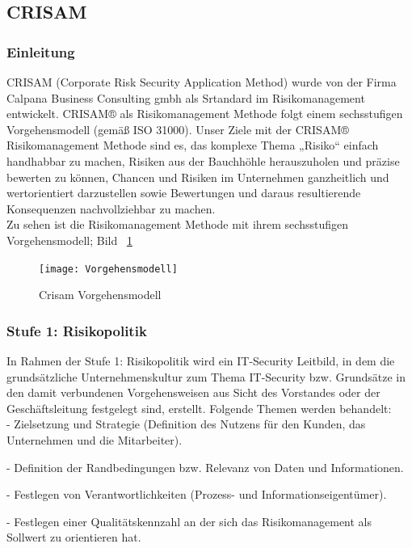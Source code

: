 \subsection{CRISAM}
\subsubsection{Einleitung}

CRISAM (Corporate Risk Security Application Method) wurde von der Firma Calpana Business Consulting gmbh als Srtandard im Risikomanagement entwickelt. CRISAM® als Risikomanagement Methode folgt einem sechsstufigen Vorgehensmodell (gemäß ISO 31000). Unser Ziele mit der CRISAM® Risikomanagement Methode sind  es,  das komplexe Thema „Risiko“ einfach handhabbar zu machen, Risiken aus der Bauchhöhle herauszuholen und präzise bewerten zu können,  Chancen und Risiken im Unternehmen ganzheitlich und  wertorientiert darzustellen sowie Bewertungen und daraus resultierende Konsequenzen nachvollziehbar zu machen.
\\

Zu sehen ist die Risikomanagement Methode mit ihrem sechsstufigen Vorgehensmodell; Bild ~\ref{fig:bsp}

\begin{figure}[htbp]
\centering
\texttt{[image: Vorgehensmodell]}
\caption{Crisam Vorgehensmodell}
\label{fig:bsp}
\end{figure}


	
\subsubsection {Stufe 1: Risikopolitik}
In Rahmen der Stufe 1: Risikopolitik wird ein IT-Security Leitbild, in dem die grundsätzliche Unternehmenskultur zum Thema IT-Security bzw. Grundsätze in den damit verbundenen Vorgehensweisen aus Sicht des Vorstandes oder der Geschäftsleitung festgelegt sind, erstellt. Folgende Themen werden behandelt:\\

- Zielsetzung und Strategie (Definition des Nutzens für den Kunden, das Unternehmen und die Mitarbeiter).

- Definition der Randbedingungen bzw. Relevanz von Daten und Informationen.

- Festlegen von Verantwortlichkeiten (Prozess- und Informationseigentümer).

- Festlegen einer Qualitätskennzahl an der sich das Risikomanagement als Sollwert zu orientieren hat.

